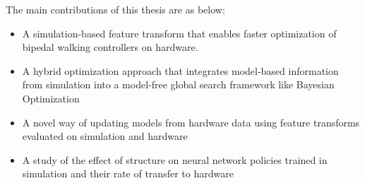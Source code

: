 The main contributions of this thesis are as below:
\begin{itemize}
    \item A simulation-based feature transform that enables faster optimization of bipedal walking controllers on hardware.
    \item A hybrid optimization approach that integrates model-based information from simulation into a model-free global search framework like Bayesian Optimization
    \item A novel way of updating models from hardware data using feature transforms evaluated on simulation and hardware
    \item A study of the effect of structure on neural network policies trained in simulation and their rate of transfer to hardware
\end{itemize}
